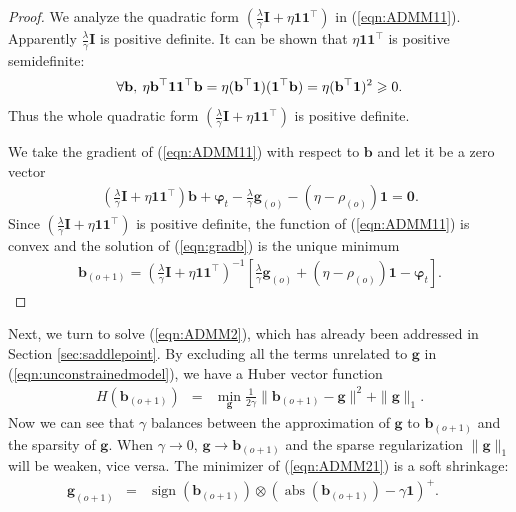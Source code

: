 \documentclass[twoside,11pt]{article}
\DeclareMathOperator*{\sign}{sign}
\DeclareMathOperator*{\abs}{abs}
\begin{document}
\begin{proof}
We analyze the quadratic form $\left( \frac{\lambda}{\gamma}\mathbf{I}+\eta\mathbf{1}\mathbf{1}^\top \right)$ in (\ref{eqn:ADMM11}). Apparently $\frac{\lambda}{\gamma}\mathbf{I}$ is positive definite. It can be shown that $\eta\mathbf{1}\mathbf{1}^\top$ is positive semidefinite:
\begin{eqnarray*}
\forall \mathbf{b}, \:\eta \mathbf{b}^\top\mathbf{1}\mathbf{1}^\top \mathbf{b}=\eta (\mathbf{b}^\top\mathbf{1})(\mathbf{1}^\top \mathbf{b})=\eta(\mathbf{b}^\top\mathbf{1})^2\geqslant 0.
\end{eqnarray*}
Thus the whole quadratic form $\left( \frac{\lambda}{\gamma}\mathbf{I}+\eta\mathbf{1}\mathbf{1}^\top \right)$ is positive definite.

We take the gradient of (\ref{eqn:ADMM11}) with respect to $\mathbf{b}$ and let it be a zero vector
\begin{eqnarray}
\label{eqn:gradb}
\left( \frac{\lambda}{\gamma}\mathbf{I}+\eta\mathbf{1}\mathbf{1}^\top \right)\mathbf{b}+ \bm{\varphi}_t-\frac{\lambda}{\gamma}\mathbf{g}_{(o)}-(\eta-\rho_{(o)})\mathbf{1} =\mathbf{0}.
\end{eqnarray}
Since $\left( \frac{\lambda}{\gamma}\mathbf{I}+\eta\mathbf{1}\mathbf{1}^\top \right)$ is positive definite, the function of (\ref{eqn:ADMM11}) is convex and the solution of (\ref{eqn:gradb}) is the unique minimum
\begin{eqnarray*}
\mathbf{b}_{(o+1)}=\left( \frac{\lambda}{\gamma}\mathbf{I}+\eta\mathbf{1}\mathbf{1}^\top \right)^{-1}\left[  \frac{\lambda}{\gamma}\mathbf{g}_{(o)}+(\eta-\rho_{(o)})\mathbf{1}-\bm{\varphi}_t  \right].
\end{eqnarray*}
\end{proof}

Next, we turn to solve (\ref{eqn:ADMM2}), which has already been addressed in Section \ref{sec:saddlepoint}. By excluding all the terms unrelated to $\mathbf{g}$ in (\ref{eqn:unconstrainedmodel}), we have a Huber vector function
\begin{eqnarray}
\label{eqn:ADMM21}
H(\mathbf{b}_{(o+1)})&=&\min_{\mathbf{g}}\frac{1}{2\gamma}\|\mathbf{b}_{(o+1)}-\mathbf{g}\|^2+\|\mathbf{g}\|_1.
\end{eqnarray}
Now we can see that $\gamma$ balances between the approximation of $\mathbf{g}$ to $\mathbf{b}_{(o+1)}$ and the sparsity of $\mathbf{g}$. When $\gamma\rightarrow 0$, $\mathbf{g}\rightarrow \mathbf{b}_{(o+1)}$ and the sparse regularization $\|\mathbf{g}\|_1$ will be weaken, vice versa. The minimizer of (\ref{eqn:ADMM21}) is a soft shrinkage:
\begin{eqnarray}
\label{eqn:softshrink}
\mathbf{g}_{(o+1)}&=&\sign(\mathbf{b}_{(o+1)})\otimes (\abs(\mathbf{b}_{(o+1)})-\gamma\mathbf{1})^+.\quad
\end{eqnarray}
\end{document}
